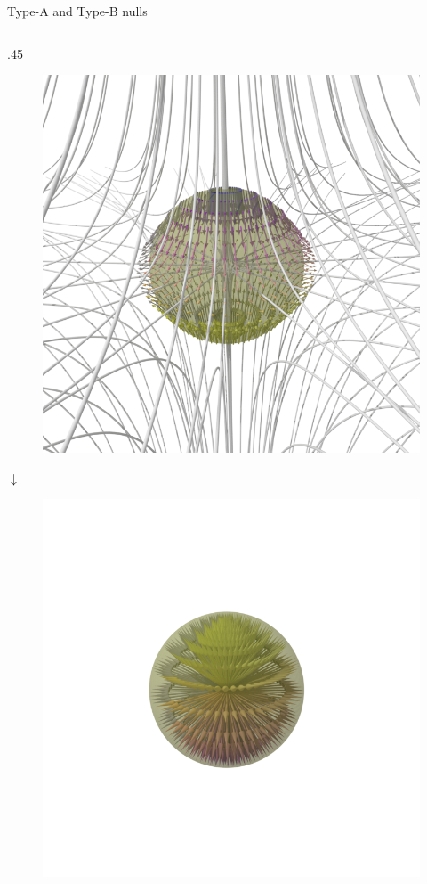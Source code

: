 \documentclass[final]{beamer}
\newlength{\onecolwid}
\newlength{\twocolwid}
\begin{document}
\begin{frame}[t]
\begin{columns}[t]
\begin{column}{\twocolwid}
\begin{columns}[t,totalwidth=\twocolwid]
\begin{column}{\onecolwid}
\begin{block}{Type-A and Type-B nulls}
\begin{columns}[t,totalwidth=\onecolwid]
\begin{column}{.45\onecolwid}
\begin{centering}
\begin{figure}
        \includegraphics[width=.45\onecolwid]{fig/negindex_start.png}
        \end{figure}
        $\downarrow$
        \begin{figure}
        \includegraphics[width=.45\onecolwid]{fig/negindex_end.png}
        \end{figure}
        \end{centering}
    \end{column}


\end{columns}
\end{block}
\end{column}
\end{columns}
\end{column}
\end{columns}
\end{frame}
\end{document}
